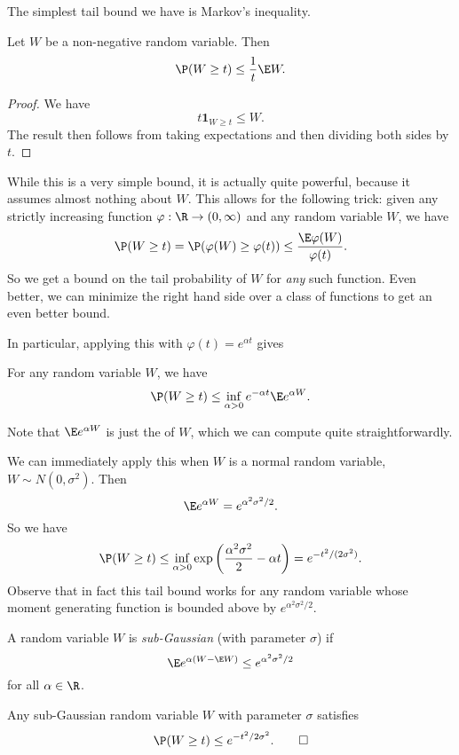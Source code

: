\documentclass[a4paper]{article}
\begin{document}
The simplest tail bound we have is Markov's inequality.
\begin{lemma}
  Let $W$ be a non-negative random variable. Then
  \[
    \P(W \geq t) \leq \frac{1}{t} \E W.
  \]
\end{lemma}

\begin{proof}
  We have
  \[
    t \mathbf{1}_{W \geq t} \leq W.
  \]
  The result then follows from taking expectations and then dividing both sides by $t$.
\end{proof}

While this is a very simple bound, it is actually quite powerful, because it assumes almost nothing about $W$. This allows for the following trick: given any strictly increasing function $\varphi: \R \to (0, \infty)$ and any random variable $W$, we have
\[
  \P(W \geq t) = \P(\varphi(W) \geq \varphi(t))\leq \frac{\E \varphi(W)}{\varphi(t)}.
\]
So we get a bound on the tail probability of $W$ for \emph{any} such function. Even better, we can minimize the right hand side over a class of functions to get an even better bound.

In particular, applying this with $\varphi (t) = e^{\alpha t}$ gives
\begin{cor}
  For any random variable $W$, we have
  \[
    \P(W \geq t) \leq \inf_{\alpha > 0} e^{-\alpha t} \E e^{\alpha W}.
  \]
\end{cor}
Note that $\E e^{\alpha W}$ is just the  of $W$, which we can compute quite straightforwardly.

We can immediately apply this when $W$ is a normal random variable, $W \sim N(0, \sigma^2)$. Then
\[
  \E e^{\alpha W} = e^{\alpha^2 \sigma^2/2}.
\]
So we have
\[
  \P(W \geq t) \leq \inf_{\alpha > 0}\exp \left(\frac{\alpha^2 \sigma^2}{2} - \alpha t\right) = e^{-t^2/(2\sigma^2)}.
\]
Observe that in fact this tail bound works for any random variable whose moment generating function is bounded above by $e^{\alpha^2 \sigma^2/2}$.

\begin{defi}
  A random variable $W$ is \emph{sub-Gaussian} (with parameter $\sigma$) if
  \[
    \E e^{\alpha (W - \E W)} \leq e^{\alpha^2 \sigma^2/2}
  \]
  for all $\alpha \in \R$.
\end{defi}

\begin{cor}
  Any sub-Gaussian random variable $W$ with parameter $\sigma$ satisfies
  \[
    \P(W \geq t) \leq e^{-t^2/2\sigma^2}.\tag*{$\square$}
  \]
\end{cor}
\end{document}
